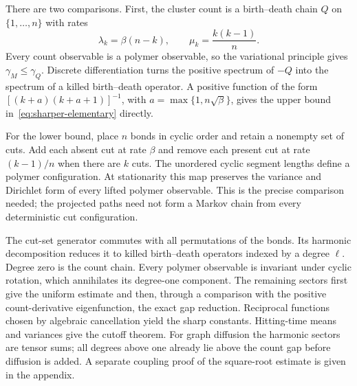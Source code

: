 There are two comparisons. First, the cluster count is a birth--death chain $Q$ on $\{1,\ldots,n\}$ with rates
\begin{equation}\label{eq:count-rates-intro}
 \lambda_k=\beta(n-k),\qquad \mu_k=\frac{k(k-1)}n.
\end{equation}
Every count observable is a polymer observable, so the variational principle gives $\gamma_M\le\gamma_Q$. Discrete differentiation turns the positive spectrum of $-Q$ into the spectrum of a killed birth--death operator. A positive function of the form $[(k+a)(k+a+1)]^{-1}$, with $a=\max\{1,n\sqrt\beta\}$, gives the upper bound in~\eqref{eq:sharper-elementary} directly.

For the lower bound, place $n$ bonds in cyclic order and retain a nonempty set of cuts. Add each absent cut at rate $\beta$ and remove each present cut at rate $(k-1)/n$ when there are $k$ cuts. The unordered cyclic segment lengths define a polymer configuration. At stationarity this map preserves the variance and Dirichlet form of every lifted polymer observable. This is the precise comparison needed; the projected paths need not form a Markov chain from every deterministic cut configuration.

The cut-set generator commutes with all permutations of the bonds.
Its harmonic decomposition reduces it to killed birth--death
operators indexed by a degree $\ell$. Degree zero is the count chain.
Every polymer observable is invariant under cyclic rotation, which
annihilates its degree-one component. The remaining sectors first
give the uniform estimate and then, through a comparison with the
positive count-derivative eigenfunction, the exact gap reduction.
Reciprocal functions chosen by algebraic cancellation yield the
sharp constants. Hitting-time means and variances give the cutoff
theorem. For graph diffusion the harmonic sectors are tensor sums;
all degrees above one already lie above the count gap before
diffusion is added. A separate coupling proof of the square-root
estimate is given in the appendix.
